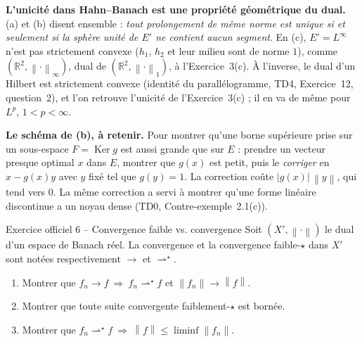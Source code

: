 \documentclass[11pt,a4paper]{article}
\newcommand{\R}{\mathbb{R}}
\newcommand{\norm}[1]{\left\|#1\right\|}
\newcommand{\wks}{\rightharpoonup^{\!\star}}
\DeclareMathOperator{\Ker}{Ker}
\theoremstyle{definition}
\begin{document}
\begin{pointcle}
\textbf{L'unicité dans Hahn--Banach est une propriété géométrique du dual.} (a) et (b) disent ensemble : \emph{tout prolongement de même norme est unique si et seulement si la sphère unité de $E'$ ne contient aucun segment}. En (c), $E'=L^\infty$ n'est pas strictement convexe ($h_1$, $h_2$ et leur milieu sont de norme $1$), comme $(\R^2,\norm\cdot_\infty)$, dual de $(\R^2,\norm\cdot_1)$, à l'Exercice~3(c). À l'inverse, le dual d'un Hilbert est strictement convexe (identité du parallélogramme, TD4, Exercice~12, question~2), et l'on retrouve l'unicité de l'Exercice~3(c) ; il en va de même pour $L^p$, $1<p<\infty$.
\end{pointcle}

\begin{methode}
\textbf{Le schéma de (b), à retenir.} Pour montrer qu'une borne supérieure prise sur un sous-espace $F=\Ker g$ est aussi grande que sur $E$ : prendre un vecteur presque optimal $x$ dans $E$, montrer que $g(x)$ est petit, puis le \emph{corriger} en $x-g(x)y$ avec $y$ fixé tel que $g(y)=1$. La correction coûte $|g(x)|\,\norm y$, qui tend vers $0$. La même correction a servi à montrer qu'une forme linéaire discontinue a un noyau dense (TD0, Contre-exemple~2.1(c)).
\end{methode}

\begin{exo}{Exercice officiel 6 -- Convergence faible vs. convergence}
Soit $(X',\norm\cdot)$ le dual d'un espace de Banach réel. La convergence et la convergence faible-$\star$ dans $X'$ sont notées respectivement $\to$ et $\wks$.
\begin{enumerate}[label=(\alph*)]
  \item Montrer que $f_n\to f\ \Rightarrow\ f_n\wks f$ et $\norm{f_n}\to\norm f$.
  \item Montrer que toute suite convergente faiblement-$\star$ est bornée.
  \item Montrer que $f_n\wks f\ \Rightarrow\ \norm f\le\liminf\norm{f_n}$.
\end{enumerate}
\end{exo}
\end{document}
